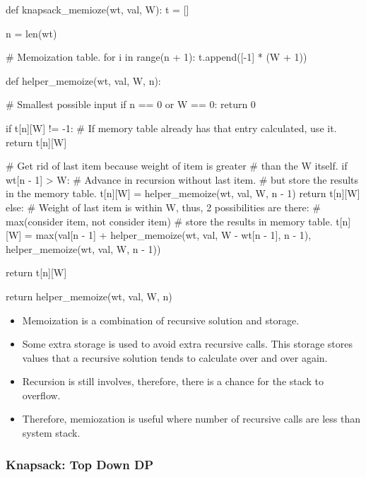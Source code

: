 \documentclass[12pt]{article}
\begin{document}
\begin{python}
def knapsack_memioze(wt, val, W):
    t = []

    n = len(wt)

    # Memoization table.
    for i in range(n + 1):
        t.append([-1] * (W + 1))

    def helper_memoize(wt, val, W, n):

        # Smallest possible input
        if n == 0 or W == 0:
            return 0

        if t[n][W] != -1:
            # If memory table already has that entry calculated, use it.
            return t[n][W]

        # Get rid of last item because weight of item is greater
        # than the W itself.
        if wt[n - 1] > W:
            # Advance in recursion without last item.
            # but store the results in the memory table.
            t[n][W] = helper_memoize(wt, val, W, n - 1)
            return t[n][W]
        else:
            # Weight of last item is within W, thus, 2 possibilities are there:
            # max(consider item, not consider item)
            # store the results in memory table.
            t[n][W] = max(val[n - 1] + helper_memoize(wt, val, W - wt[n - 1], n - 1),
                          helper_memoize(wt, val, W, n - 1))

            return t[n][W]

    return helper_memoize(wt, val, W, n)
\end{python}

\begin{itemize}
\item Memoization is a combination of recursive solution and storage. 

\item Some extra storage is used to avoid extra recursive calls. This storage stores values that a recursive solution tends to calculate over and over again. 

\item Recursion is still involves, therefore, there is a chance for the stack to overflow. 

\item Therefore, memiozation is useful where number of recursive calls are less than system stack.

\end{itemize}
\pagebreak
\subsubsection{Knapsack: Top Down DP}
\end{document}
